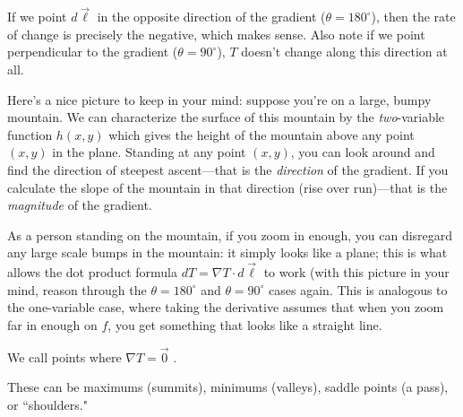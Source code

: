 If we point $d\vec{\ell}$ in the opposite direction of the gradient ($\theta=180^\circ$), then the rate of change is precisely the negative, which makes sense. Also note if we point perpendicular to the gradient ($\theta=90^\circ$), $T$ doesn't change along this direction at all.

Here's a nice picture to keep in your mind: suppose you're on a large, bumpy mountain. We can characterize the surface of this mountain by the \textit{two}-variable function $h(x,y)$ which gives the height of the mountain above any point $(x,y)$ in the plane. Standing at any point $(x,y)$, you can look around and find the direction of steepest ascent---that is the \textit{direction} of the gradient. If you calculate the slope of the mountain in that direction (rise over run)---that is the \textit{magnitude} of the gradient. 

As a person standing on the mountain, if you zoom in enough, you can disregard any large scale bumps in the mountain: it simply looks like a plane; this is what allows the dot product formula $dT=\nabla T\cdot d\vec{\ell}$ to work (with this picture in your mind, reason through the $\theta=180^\circ$ and $\theta=90^\circ$ cases again. This is analogous to the one-variable case, where taking the derivative assumes that when you zoom far in enough on $f$, you get something that looks like a straight line. 

\begin{definition}
We call points where $\nabla T=\vec{0}$ .
\end{definition}

These can be maximums (summits), minimums (valleys), saddle points (a pass), or ``shoulders."




